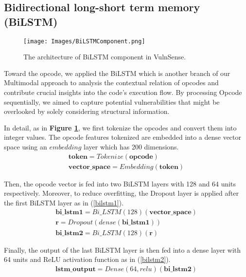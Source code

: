 \subsection{Bidirectional long-short term memory (BiLSTM)}
\label{subsec_lstm}
\begin{figure}[h]
\centering
\texttt{[image: Images/BiLSTMComponent.png]}
\caption{The architecture of BiLSTM component in VulnSense.} \label{bilstm}
\end{figure}
Toward the opcode, we applied the BiLSTM which is another branch of our Multimodal approach to analysis the contextual relation of opcodes and contribute crucial insights into the code's execution flow. By processing Opcode sequentially, we aimed to capture potential vulnerabilities that might be overlooked by solely considering structural information. 

In detail, as in \textbf{Figure \ref{bilstm}}, we first tokenize the opcodes and convert them into integer values. The opcode features tokenized are embedded into a dense vector space using an $embedding$ layer which has 200 dimensions.
\begin{equation}\label{embedded}
\begin{split}
    \mathbf{token} = Tokenize(\mathbf{opcode}) \\
    \mathbf{vector\_space} = Embedding(\mathbf{token})
\end{split}
\end{equation}

Then, the opcode vector is fed into two BiLSTM layers with 128 and 64 units respectively. Moreover, to reduce overfitting, the Dropout layer is applied after the first BiLSTM layer  as in (\ref{bilstm1}).
\begin{equation}\label{bilstm1}
\begin{split}
    \mathbf{bi\_lstm1} = Bi\_LSTM(128)(\mathbf{vector\_space}) \\
    \mathbf{r} = Dropout(dense(\mathbf{bi\_lstm1})) \\
    \mathbf{bi\_lstm2} = Bi\_LSTM(128)(\mathbf{r})
\end{split}
\end{equation}

Finally, the output of the last BiLSTM layer is then fed into a dense layer with 64 units and ReLU activation function as in (\ref{bilstm2}).
\begin{equation}\label{bilstm2}
\begin{split}
    \mathbf{lstm\_output} = Dense(64, relu)(\mathbf{bi\_lstm2})
\end{split}
\end{equation}


